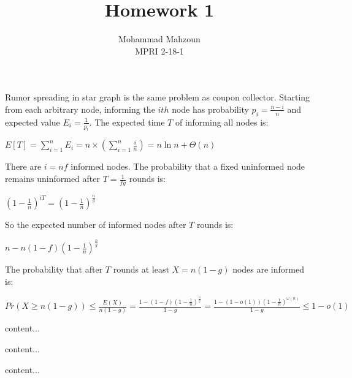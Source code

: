 \documentclass[12pt]{article}
\newenvironment{exercise}[2][Exercise]{\begin{trivlist}
\item[\hskip \labelsep {\bfseries #1}\hskip \labelsep {\bfseries #2.}]}{\end{trivlist}}
\begin{document}
 
 
\title{Homework 1}%
\author{Mohammad Mahzoun\\ %
MPRI 2-18-1} %
 
\maketitle
 
\begin{exercise}{1.1}
	Rumor spreading in star graph is the same problem as coupon collector. Starting from each arbitrary node, informing the $ith$ node has probability $p_i = \frac{n-i}{n}$ and expected value $E_i = \frac{1}{p_i}$. The expected time $T$ of informing all nodes is:
	\begin{center}
		$E[T] = \sum_{i = 1}^{n} E_i  = n\times(\sum_{i = 1}^{n} \frac{i}{n}) = 
		n \ln n + \Theta(n)$
	\end{center}
\end{exercise}

\begin{exercise}{1.2}
	There are $i = nf$ informed nodes. The probability that a fixed uninformed node remains uninformed after $T = \frac{1}{fg}$ rounds is:
	\begin{center}
		$(1 - \frac{1}{n})^{iT} = (1 - \frac{1}{n})^{\frac{n}{g}} $
	\end{center}
	So the expected number of informed nodes after $T$ rounds is:
	\begin{center}
		$n -  n(1-f)(1 - \frac{1}{n})^{\frac{n}{g}} $
	\end{center}
	The probability that after $T$ rounds at least $X = n(1-g)$ nodes are informed is:
	\begin{center}
		$Pr(X \geq n(1-g)) \leq \frac{E(X)}{n(1-g)} = 
		\frac{1 - (1-f)(1-\frac{1}{n})^{\frac{n}{g}}}{1-g} = \frac{1 - (1 - o(1))(1-\frac{1}{n})^{\omega(n)}}{1-g} \leq 1 - o(1)$
	\end{center}
\end{exercise}
 
\begin{exercise}{1.3}
	content...
\end{exercise}

\begin{exercise}{1.4}
	content...
\end{exercise}

\begin{exercise}{1.5}
	content...
\end{exercise}

 
\end{document}
